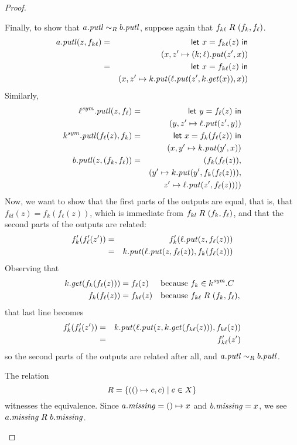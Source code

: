 \begin{defn}[$R$-similarity]
\begin{theorem}
\begin{lemma}
\begin{theorem}[No products]
\begin{lemma}
\begin{defn}
\begin{theorem}
\begin{theorem}
\begin{corollary}[Hylomorphism]
\begin{defn}
\begin{defn}
\begin{defn}[Symmetrization]
\begin{proof}
\begin{longenum}
Finally, to show that $a.\mathit{putl} \sim_R b.\mathit{putl}$, suppose again that
$f_{k\ell}\mathrel{R_{}}(f_k,f_\ell)$.
\begin{eqnarray*}
    a.\mathit{putl}(z,f_{k\ell})
    &=& \mathsf{let}\  x = f_{k\ell}(z) \ \mathsf{in} \\
    & & (x,z'\mapsto(k;\ell).\mathit{put}(z',x)) \\
    &=& \mathsf{let}\  x = f_{k\ell}(z) \ \mathsf{in} \\
    & & (x,z' \mapsto k.\mathit{put}(\ell.\mathit{put}(z',k.\mathit{get}(x)),x))
\end{eqnarray*}
Similarly,
\begin{eqnarray*}
    \ell^\mathit{sym}.\mathit{putl}(z,f_\ell)
    &=& \mathsf{let}\  y = f_\ell(z) \ \mathsf{in} \\
    & & (y,z' \mapsto \ell.\mathit{put}(z',y)) \\
    k^\mathit{sym}.\mathit{putl}(f_\ell(z),f_k)
    &=& \mathsf{let}\  x = f_k(f_\ell(z)) \ \mathsf{in} \\
    & & (x,y' \mapsto k.\mathit{put}(y',x)) \\
    b.\mathit{putl}(z,(f_k,f_\ell))
    &=& (f_k(f_\ell(z)), \\
    & & (y' \mapsto k.\mathit{put}(y',f_k(f_\ell(z))), \\
    & & z' \mapsto \ell.\mathit{put}(z',f_\ell(z))))
\end{eqnarray*}
Now, we want to show that the first parts of the outputs are equal, that is,
that $f_{kl}(z) = f_k(f_\ell(z))$, which is immediate from
$f_{kl}\mathrel{R_{}}(f_k,f_\ell)$, and that the second parts of the outputs are
related:
\begin{eqnarray*}
    f_k'(f_\ell'(z')) &=& f_k'(\ell.\mathit{put}(z,f_\ell(z))) \\
    &=& k.\mathit{put}(\ell.\mathit{put}(z,f_\ell(z)),f_k(f_\ell(z)))
\end{eqnarray*}
Observing that
\begin{align*}
    k.\mathit{get}(f_k(f_\ell(z))) &= f_\ell(z) && \mbox{because }f_k \in k^\mathit{sym}.C \\
    f_k(f_\ell(z)) &= f_{k\ell}(z) && \mbox{because }f_{k\ell} \mathrel{R_{}}(f_k,f_\ell),
\end{align*}
that last line becomes
\begin{eqnarray*}
    f_k'(f_\ell'(z'))
    &=& k.\mathit{put}(\ell.\mathit{put}(z,k.\mathit{get}(f_{k\ell}(z))),f_{k\ell}(z)) \\
    &=& f_{k\ell}'(z')
\end{eqnarray*}
so the second parts of the outputs are related after all, and $a.\mathit{putl}
\sim_R b.\mathit{putl}$.

\item The relation
\[R = \{({()} \mapsto c,c) \mid c \in X\}\]
witnesses the equivalence. Since $a.\mathit{missing} = {()} \mapsto x$ and
$b.\mathit{missing} = x$, we see $a.\mathit{missing} \mathrel{R_{}} b.\mathit{missing}$.


\end{longenum}
\end{proof}
\end{defn}
\end{defn}
\end{defn}
\end{corollary}
\end{theorem}
\end{theorem}
\end{defn}
\end{lemma}
\end{theorem}
\end{lemma}
\end{theorem}
\end{defn}
